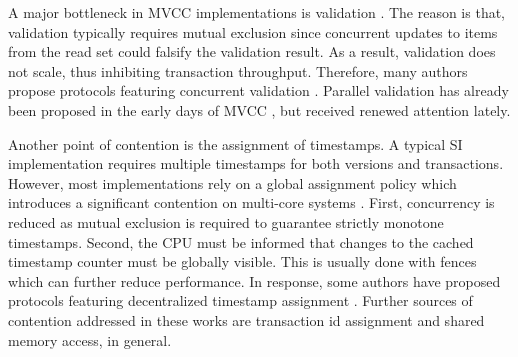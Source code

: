 A major bottleneck in \ac{MVCC} implementations is validation
\cite{tu2013speedy, bailey2013exploring, ding2015centiman,
faleiro2015rethinking, wang2017efficiently, zhou2017posterior}. The reason is
that, validation typically requires mutual exclusion since concurrent updates to
items from the read set could falsify the validation result. As a result,
validation does not scale, thus inhibiting transaction throughput. Therefore,
many authors propose protocols featuring concurrent validation
\cite{bailey2013exploring, ding2015centiman, faleiro2015rethinking,
wang2017efficiently}. Parallel validation has already been proposed in the early
days of \ac{MVCC} \cite{kung1981optimistic}, but received renewed attention
lately.

Another point of contention is the assignment of timestamps. A typical \ac{SI}
implementation requires multiple timestamps for both versions and transactions.
However, most implementations rely on a global assignment policy which
introduces a significant contention on multi-core systems \cite{tu2013speedy,
zhou2017posterior}. First, concurrency is reduced as mutual exclusion is
required to guarantee strictly monotone timestamps. Second, the \ac{CPU} must be
informed that changes to the cached timestamp counter must be globally visible.
This is usually done with fences which can further reduce performance. In
response, some authors have proposed protocols featuring decentralized timestamp
assignment \cite{tu2013speedy, zhou2017posterior}. Further sources of contention
addressed in these works are transaction id assignment and shared memory access,
in general.
